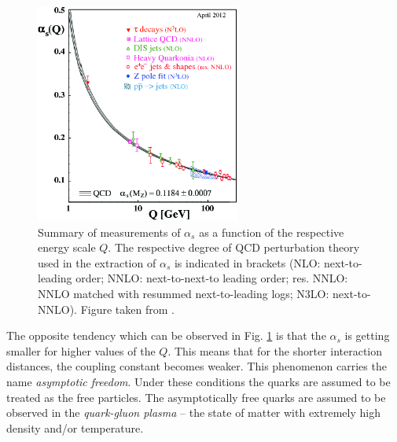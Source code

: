 \begin{figure}[t]
  \centering
  \includegraphics[width=0.6\textwidth]{01_Theory_SM/plots/Alpha_s.png}
  \caption{Summary of measurements of $\alpha_s$ as a function of the respective energy scale $Q$. The respective degree of QCD perturbation 
  theory used in the extraction of $\alpha_{s}$ is indicated in brackets (NLO: next-to-leading order; NNLO: next-to-next-to leading order; 
  res. NNLO: NNLO matched with resummed next-to-leading logs; N3LO: next-to-NNLO). Figure taken from \cite{PDG-2012}.}
  \label{fig:Alpha_s}
\end{figure}

The opposite tendency which can be observed in Fig. \ref{fig:Alpha_s} is that the $\alpha_{s}$ is getting smaller for higher values 
of the $Q$. This means that for the shorter interaction distances, the coupling constant becomes weaker. This phenomenon carries the 
name \textit{asymptotic freedom}\cite{PhysRevLett.30.1343}. Under these conditions the quarks are assumed to be treated as the free particles. The asymptotically 
free quarks are assumed to be observed in the \textit{quark-gluon plasma} \cite{Bohr1977275} -- the state of matter with extremely high density and/or temperature.



